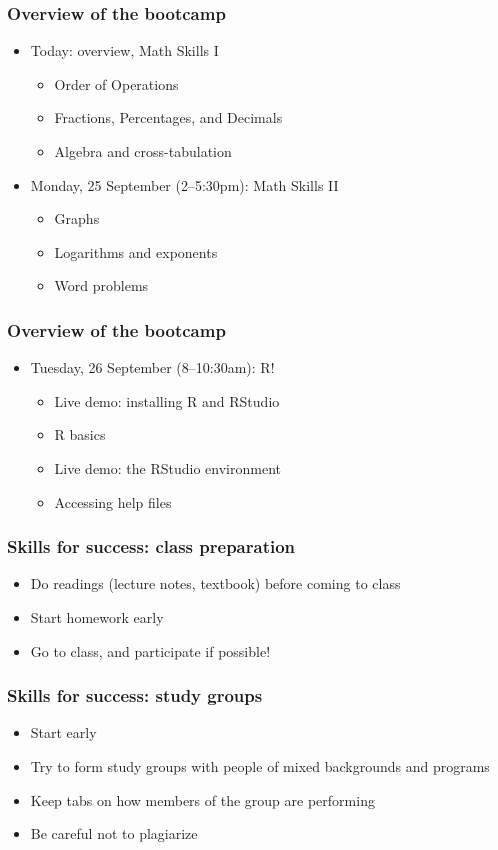 \documentclass[12pt]{beamer}
\newcommand{\myframe}[1]{\begin{frame} \frametitle{#1}}
\newenvironment{spaceitemize}
{ \begin{itemize}
    \setlength{\itemsep}{10pt}
    \setlength{\parskip}{0pt}
    \setlength{\parsep}{0pt}     }
{ \end{itemize}                  }
\begin{document}
\myframe{Overview of the bootcamp}
\begin{spaceitemize}
\item Today: overview, Math Skills I
\begin{spaceitemize}
\item Order of Operations
\item Fractions, Percentages, and Decimals
\item Algebra and cross-tabulation
\end{spaceitemize}
\item Monday, 25 September (2--5:30pm): Math Skills II
\begin{spaceitemize}
\item Graphs
\item Logarithms and exponents
\item Word problems
\end{spaceitemize}
\end{spaceitemize}
\end{frame}

\myframe{Overview of the bootcamp}
\begin{spaceitemize}
\item Tuesday, 26 September (8--10:30am): R! 
\begin{spaceitemize}
\item Live demo: installing R and RStudio
\item R basics
\item Live demo: the RStudio environment
\item Accessing help files
\end{spaceitemize}
\end{spaceitemize}
\end{frame}

\myframe{Skills for success: class preparation}
\begin{spaceitemize}
\item Do readings (lecture notes, textbook) before coming to class
\item Start homework early
\item Go to class, and participate if possible!
\end{spaceitemize}
\end{frame}

\myframe{Skills for success: study groups}
\begin{spaceitemize}
\item Start early
\item Try to form study groups with people of mixed backgrounds and programs
\item Keep tabs on how members of the group are performing
\item Be careful not to plagiarize
\end{spaceitemize}
\end{frame}
\end{document}
